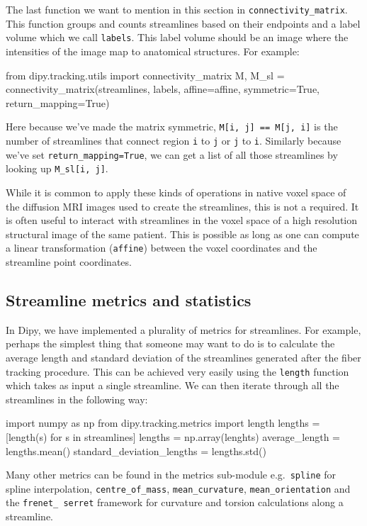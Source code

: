 \documentclass{bioinfo}
\begin{document}
The last function we want to mention in this section in
\texttt{connectivity\_matrix}. This function groups and counts streamlines
based on their endpoints and a label volume which we call \texttt{labels}. This
label volume should be an image where the intensities of the image map to
anatomical structures. For example:

\begin{python}
from dipy.tracking.utils import
                              connectivity_matrix
M, M_sl = connectivity_matrix(streamlines, labels,
                              affine=affine,
                              symmetric=True,
                              return_mapping=True)
\end{python}

Here because we've made the matrix symmetric, \texttt{M[i, j] == M[j, i]} is the number of streamlines that connect region \texttt{i} to \texttt{j}
or \texttt{j} to \texttt{i}. Similarly because we've set
\texttt{return\_mapping=True}, we can get a list of all those streamlines by
looking up \texttt{M\_sl[i, j]}.

While it is common to apply these kinds of operations in native voxel space of
the diffusion MRI images used to create the streamlines, this is not a
required. It is often useful to interact with streamlines in the voxel space of
a high resolution structural image of the same patient. This is possible as
long as one can compute a linear transformation (\texttt{affine}) between the voxel coordinates and the streamline point coordinates.

\subsection{Streamline metrics and statistics}

In Dipy, we have implemented a plurality of metrics for streamlines. For example,
perhaps the simplest thing that someone may want to do is to calculate the
average length and standard deviation of the streamlines generated after the
fiber tracking procedure. This can be achieved very easily using the \texttt{length}
function which takes as input a single streamline. We can then iterate through
all the streamlines in the following way:
\begin{python}
import numpy as np
from dipy.tracking.metrics import length
lengths = [length(s) for s in streamlines]
lengths = np.array(lenghts)
average_length = lengths.mean()
standard_deviation_lengths = lengths.std()
\end{python}
Many other metrics can be found in the metrics sub-module e.g.~\texttt{spline} for
spline interpolation, \texttt{centre\_of\_mass}, \texttt{mean\_curvature},
\texttt{mean\_orientation} and the \texttt{frenet\_ serret} framework for curvature
and torsion calculations along a streamline.
\end{document}
